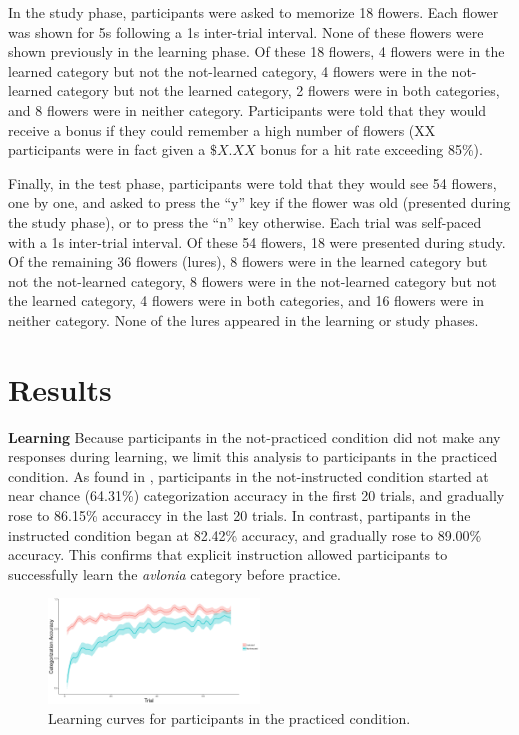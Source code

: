 \documentclass[twocolumn]{svjour3}          %
\begin{document}
In the study phase, participants were asked to memorize 18
flowers. Each flower was shown for 5s following a 1s inter-trial
interval. None of these flowers were shown previously in the learning
phase. Of these 18 flowers, 4 flowers were in the learned category but
not the not-learned category, 4 flowers were in the not-learned
category but not the learned category, 2 flowers were in both
categories, and 8 flowers were in neither category. Participants were
told that they would receive a bonus if they could remember a high
number of flowers (XX participants were in fact given a $\$X.XX$ bonus
for a hit rate exceeding 85\%).

Finally, in the test phase, participants were told that they would see
54 flowers, one by one, and asked to press the ``y'' key if the flower
was old (presented during the study phase), or to press the ``n'' key
otherwise. Each trial was self-paced with a 1s inter-trial
interval. Of these 54 flowers, 18 were presented during study. Of the
remaining 36 flowers (lures), 8 flowers were in the learned category
but not the not-learned category, 8 flowers were in the not-learned
category but not the learned category, 4 flowers were in both
categories, and 16 flowers were in neither category. None of the lures
appeared in the learning or study phases.

\section*{Results}
\label{results}

\noindent\textbf{Learning }
Because participants in the not-practiced condition did not make any
responses during learning, we limit this analysis to participants in
the practiced condition. As found in \citet{DeBrigard2017},
participants in the not-instructed condition started at near chance
(64.31\%) categorization accuracy in the first 20 trials, and
gradually rose to 86.15\% accuraccy in the last 20 trials. In
contrast, partipants in the instructed condition began at 82.42\%
accuracy, and gradually rose to 89.00\% accuracy. This confirms that
explicit instruction allowed participants to successfully learn the
\emph{avlonia} category before practice.

\begin{figure}
  \includegraphics[width=0.5\textwidth]{learning.png}
  \caption{Learning curves for participants in the practiced
    condition.}
  \label{fig:learning}
\end{figure}
\end{document}
